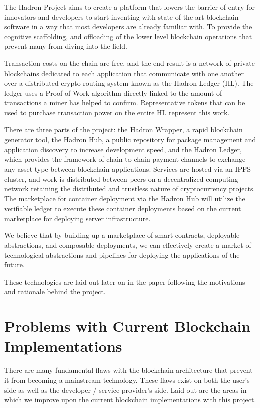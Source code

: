 \documentclass{%
	article}
\begin{document}
The Hadron Project aims to create a platform that lowers the barrier of entry for innovators and developers to start inventing with state-of-the-art blockchain software in a way that most developers are already familiar with. To provide the cognitive scaffolding, and offloading of the lower level blockchain operations that prevent many from diving into the field.

Transaction costs on the chain are free, and the end result is a network of private blockchains dedicated to each application that communicate with one another over a distributed crypto routing system known as the Hadron Ledger (HL). The ledger uses a Proof of Work algorithm directly linked to the amount of transactions a miner has helped to confirm. Representative tokens that can be used to purchase transaction power on the entire HL represent this work.

There are three parts of the project: the Hadron Wrapper, a rapid blockchain generator tool, the Hadron Hub, a public repository for package management and application discovery to increase development speed, and the Hadron Ledger, which provides the framework of chain-to-chain payment channels to exchange any asset type between blockchain applications. Services are hosted via an IPFS cluster, and work is distributed between peers on a decentralized computing network retaining the distributed and trustless nature of cryptocurrency projects. The marketplace for container deployment via the Hadron Hub will utilize the verifiable ledger to execute these container deployments based on the current marketplace for deploying server infrastructure.

We believe that by building up a marketplace of smart contracts, deployable abstractions, and composable deployments, we can effectively create a market of technological abstractions and pipelines for deploying the applications of the future.

These technologies are laid out later on in the paper following the motivations and rationale behind the project.

\section{Problems with Current Blockchain\\ Implementations}

There are many fundamental flaws with the blockchain architecture that prevent it from becoming a mainstream technology. These flaws exist on both the user’s side as well as the developer / service provider’s side. Laid out are the areas in which we improve upon the current blockchain implementations with this project.
\end{document}
